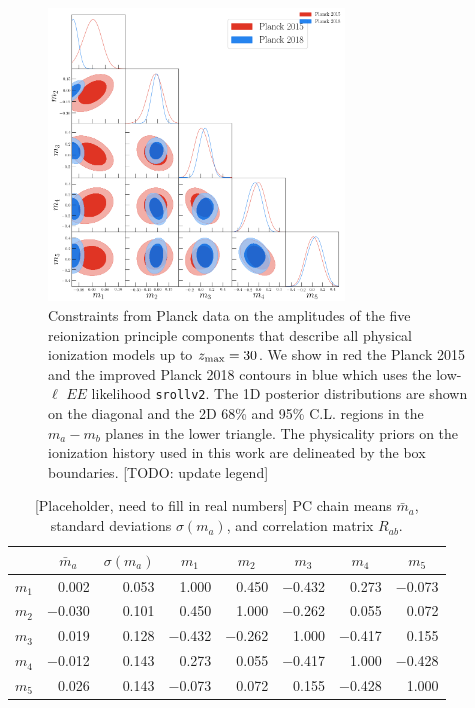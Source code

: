 \documentclass[prd,twocolumn,amsmath,amssymb,floatfix,superscriptaddress,nofootinbib]{revtex4-1}
\begin{document}
\begin{widetext}

\begin{figure}
\includegraphics[width=0.7\textwidth]{plots/plot_mj_triangle_t18_r12_t19_t20_vs_pl18_pc_zmax30_pliklite_srollv2_1015.png}
\caption{Constraints from Planck data on the amplitudes of the five reionization principle components that describe all physical ionization models up to $z_{\rm max} = 30$. We show in red the Planck 2015 and the improved Planck 2018 contours in blue which uses the low-$\ell$ $EE$ likelihood \texttt{srollv2}. The 1D posterior distributions are shown on the diagonal and the 2D 68\% and 95\% C.L. regions in the $m_a-m_b$ planes in the lower triangle. The physicality priors on the ionization history used in this work are delineated by the box boundaries. [TODO: update legend]}
\label{fig:plot_mjs_2018_vs_2015}
\end{figure}

\end{widetext}

\begin{table}[b]
\centering
\caption{[Placeholder, need to fill in real numbers] PC chain means $\bar m_a$, standard deviations $\sigma(m_a)$, and correlation matrix $R_{ab}$.}
\label{tab:PC_stats}
\begin{tabular}{|r | r r@{\hskip 0.06in}|r r r r r|}
\hline
		
			  &  \multicolumn{1}{c}{$\bar m_a$} & \multicolumn{1}{c}{$\sigma(m_a)$}	 & \multicolumn{1}{|c}{$m_1$} & \multicolumn{1}{c}{$m_2$} & \multicolumn{1}{c}{$m_3$} & \multicolumn{1}{c}{$m_4$} & \multicolumn{1}{c|}{$m_5$} 
		\\ \hline
$m_1$ 
	& 0.002 & 0.053 & 1.000 & 0.450 & $-$0.432 & 0.273 & $-$0.073 \\ 
$m_2$ 
	& $-$0.030 &  0.101 & 0.450 & 1.000 & $-$0.262 & 0.055 & 0.072 \\ 
$m_3$ 
	& 0.019 &  0.128 & $-$0.432 & $-$0.262 &1.000 & $-$0.417 & 0.155 \\
$m_4$  
	& $-$0.012 & 0.143 &  0.273 & 0.055 & $-$0.417 & 1.000 & $-$0.428 \\ 
$m_5$ 
	& 0.026 & 0.143 & $-$0.073 & 0.072 & 0.155 & $-$0.428 & 1.000\\ \hline
\end{tabular}
\end{table}
\end{document}
